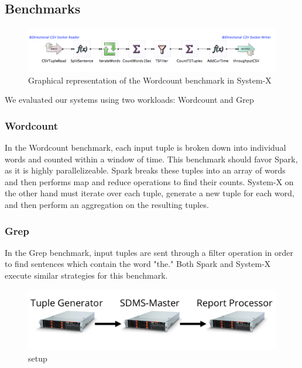 \subsection{Benchmarks}

\begin{figure}[t]
\centering
\includegraphics[width=1\linewidth]{figures/System-XWorkflow.pdf}
\caption{Graphical representation of the Wordcount benchmark in System-X}
\label{fig:wordcount}
\end{figure}

We evaluated our systems using two workloads: Wordcount and Grep

\subsubsection{Wordcount}
In the Wordcount benchmark, each input tuple is broken down into individual words and counted within a window of time.  This benchmark should favor Spark, as it is highly parallelizeable.   Spark breaks these tuples into an array of words and then performs map and reduce operations to find their counts.  System-X on the other hand must iterate over each tuple, generate a new tuple for each word, and then perform an aggregation on the resulting tuples.

\subsubsection{Grep}
In the Grep benchmark, input tuples are sent through a filter operation in order to find sentences which contain the word "the."  Both Spark and System-X execute similar strategies for this benchmark.

\begin{figure}[t]
\centering
\includegraphics[width=1\linewidth]{figures/diagram.pdf}
\caption{setup}
\label{fig:sb1-tput}
\end{figure}

